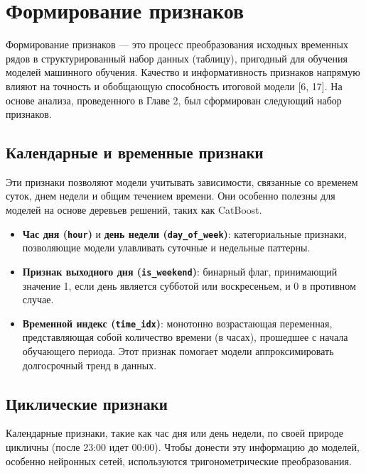 \section{Формирование признаков}
\label{sec:feature_engineering}

\hspace*{1.25cm}Формирование признаков --- это процесс преобразования исходных временных рядов в структурированный набор данных (таблицу), пригодный для обучения моделей машинного обучения. Качество и информативность признаков напрямую влияют на точность и обобщающую способность итоговой модели [6, 17]. На основе анализа, проведенного в Главе 2, был сформирован следующий набор признаков.

\subsection{Календарные и временные признаки}

\hspace*{1.25cm}Эти признаки позволяют модели учитывать зависимости, связанные со временем суток, днем недели и общим течением времени. Они особенно полезны для моделей на основе деревьев решений, таких как CatBoost.

\begin{itemize}
	\item \textbf{Час дня (\texttt{hour})} и \textbf{день недели (\texttt{day\_of\_week})}: категориальные признаки, позволяющие модели улавливать суточные и недельные паттерны.
	\item \textbf{Признак выходного дня (\texttt{is\_weekend})}: бинарный флаг, принимающий значение 1, если день является субботой или воскресеньем, и 0 в противном случае.
	\item \textbf{Временной индекс (\texttt{time\_idx})}: монотонно возрастающая переменная, представляющая собой количество времени (в часах), прошедшее с начала обучающего периода. Этот признак помогает модели аппроксимировать долгосрочный тренд в данных.
\end{itemize}

\subsection{Циклические признаки}

\hspace*{1.25cm}Календарные признаки, такие как час дня или день недели, по своей природе цикличны (после 23:00 идет 00:00). Чтобы донести эту информацию до моделей, особенно нейронных сетей, используются тригонометрические преобразования.

